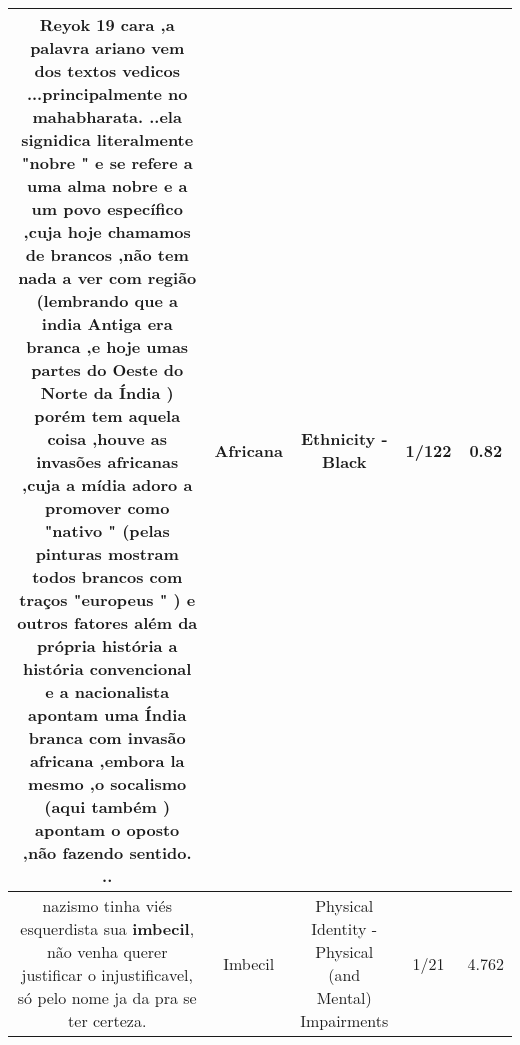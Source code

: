 \documentclass[11pt]{article}
\newlength\mylength
\begin{document}
\begin{center}
\begin{longtable}{|C{.65\mylength}|C{.30\mylength}|C{.12\mylength}|C{.12\mylength}|C{.12\mylength}|}
  \small Reyok 19 cara ,a palavra ariano vem dos textos vedicos ...principalmente no mahabharata. ..ela signidica literalmente "nobre " e se refere a uma alma nobre e a um povo específico ,cuja hoje chamamos de brancos ,não tem nada a ver com região (lembrando que a india Antiga era branca ,e hoje umas partes do Oeste do Norte da Índia ) porém tem aquela coisa ,houve as invasões africanas ,cuja a mídia adoro a promover como "nativo " (pelas pinturas mostram todos brancos com traços "europeus " ) e outros fatores além da própria história a história convencional e a nacionalista apontam uma Índia branca com invasão \textbf{africana} ,embora la mesmo ,o socalismo (aqui também ) apontam o oposto ,não fazendo sentido. ..\normalsize   & Africana & Ethnicity - Black & 1/122 & 0.82 \\  \hline
  \small nazismo tinha viés esquerdista sua \textbf{imbecil}, não venha querer justificar o injustificavel, só pelo nome ja da pra se ter certeza.\normalsize   & Imbecil & Physical Identity - Physical (and Mental) Impairments & 1/21 & 4.762 \\  \hline

\end{longtable}
\end{center}
\end{document}
